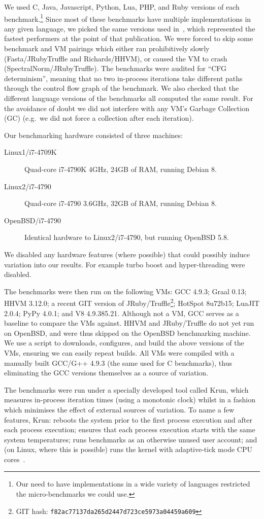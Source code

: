 \documentclass[preprint]{sigplanconf}
\newcommand{\krun}{Krun\xspace}
\newcommand{\bencherthree}{Linux1/i7-4709K\xspace}
\newcommand{\bencherfive}{Linux2/i7-4790\xspace}
\newcommand{\benchersix}{OpenBSD/i7-4790\xspace}
\begin{document}
We used C, Java, Javascript, Python, Lua, PHP,
and Ruby versions of each benchmark.\footnote{Our need to have implementations in a wide variety
of languages restricted the micro-benchmarks we could use.} Since most of these
benchmarks have multiple implementations in any given language, we picked
the same versions used in~\cite{bolz14impact}, which represented the fastest
performers at the point of that publication. We were forced to skip some
benchmark and VM pairings which either ran prohibitively slowly
(Fasta/JRubyTruffle and Richards/HHVM), or caused the VM to crash
(SpectralNorm/JRubyTruffle). The benchmarks were audited for ``CFG
determinism'', meaning that no two in-process iterations take different paths
through the control flow graph of the benchmark. We also checked that the
different language versions of the benchmarks all computed the same result.
For the avoidance of doubt we did not interfere with any VM's Garbage
Collection (GC) (e.g.~we did not force a collection after each iteration).

Our benchmarking hardware consisted of three machines:

\begin{description}
\item[\bencherthree] Quad-core i7-4790K 4GHz, 24GB of RAM, running Debian 8.
\item[\bencherfive] Quad-core i7-4790 3.6GHz, 32GB of RAM, running Debian 8.
\item[\benchersix] Identical hardware to \bencherfive, but running OpenBSD 5.8.
\end{description}

\noindent We disabled any hardware features (where possible) that could
possibly induce variation into our results. For example turbo boost and
hyper-threading were disabled.

The benchmarks were then run on the following VMs: GCC 4.9.3; Graal 0.13;
HHVM 3.12.0; a recent GIT version of JRuby/Truffle\footnote{GIT
hash: \texttt{f82ac77137da265d2447d723ce5973a04459a609}}; HotSpot 8u72b15;
LuaJIT 2.0.4; PyPy 4.0.1; and V8 4.9.385.21. Although not a VM, GCC serves as a
baseline to compare the VMs against. HHVM and JRuby/Truffle do not yet run on
OpenBSD, and were thus skipped on the OpenBSD benchmarking machine.
We use a script to downloads, configures, and build the above
versions of the VMs, ensuring we can easily repeat builds. All VMs were
compiled with a manually built GCC/G++ 4.9.3 (the same used for C benchmarks),
thus eliminating the GCC versions themselves as a source of variation.

The benchmarks were run under a specially developed tool called \krun, which
measures in-process iteration times (using a monotonic clock) whilst in a
fashion which minimises the effect of external sources of variation. To name a
few features, \krun: reboots the system prior to the first process execution
and after each process execution; ensures that each process execution starts
with the same system temperatures; runs benchmarks as an otherwise unused user
account; and (on Linux, where this is possible) runs the kernel with
adaptive-tick mode CPU cores~\cite{tickless}.



\end{document}
